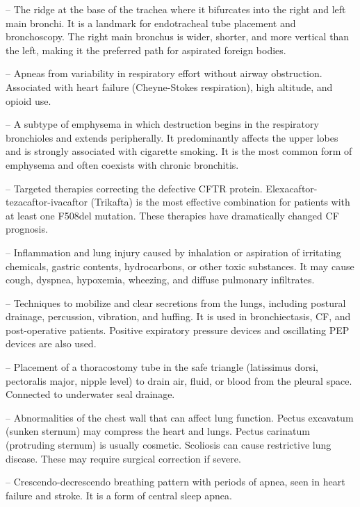 -- The ridge at the base of the trachea where it bifurcates into the right and left main bronchi. It is a landmark for endotracheal tube placement and bronchoscopy. The right main bronchus is wider, shorter, and more vertical than the left, making it the preferred path for aspirated foreign bodies.

-- Apneas from variability in respiratory effort without airway obstruction. Associated with heart failure (Cheyne-Stokes respiration), high altitude, and opioid use.

-- A subtype of emphysema in which destruction begins in the respiratory bronchioles and extends peripherally. It predominantly affects the upper lobes and is strongly associated with cigarette smoking. It is the most common form of emphysema and often coexists with chronic bronchitis.

-- Targeted therapies correcting the defective CFTR protein. Elexacaftor-tezacaftor-ivacaftor (Trikafta) is the most effective combination for patients with at least one F508del mutation. These therapies have dramatically changed CF prognosis.

-- Inflammation and lung injury caused by inhalation or aspiration of irritating chemicals, gastric contents, hydrocarbons, or other toxic substances. It may cause cough, dyspnea, hypoxemia, wheezing, and diffuse pulmonary infiltrates.

-- Techniques to mobilize and clear secretions from the lungs, including postural drainage, percussion, vibration, and huffing. It is used in bronchiectasis, CF, and post-operative patients. Positive expiratory pressure devices and oscillating PEP devices are also used.

-- Placement of a thoracostomy tube in the safe triangle (latissimus dorsi, pectoralis major, nipple level) to drain air, fluid, or blood from the pleural space. Connected to underwater seal drainage.

-- Abnormalities of the chest wall that can affect lung function. Pectus excavatum (sunken sternum) may compress the heart and lungs. Pectus carinatum (protruding sternum) is usually cosmetic. Scoliosis can cause restrictive lung disease. These may require surgical correction if severe.

-- Crescendo-decrescendo breathing pattern with periods of apnea, seen in heart failure and stroke. It is a form of central sleep apnea.

